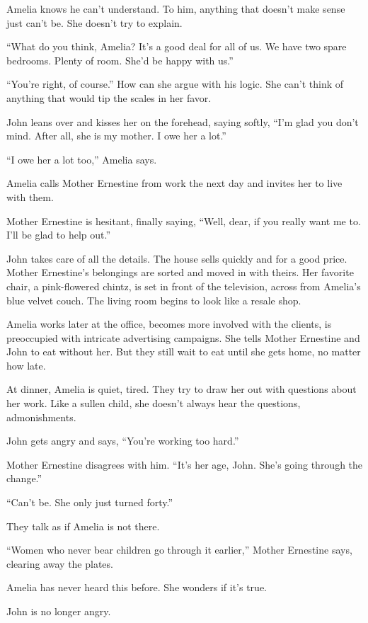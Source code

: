 \documentclass[
]{article}
\begin{document}
Amelia knows he can't understand. To him, anything that doesn't make
sense just can't be. She doesn't try to explain.

``What do you think, Amelia? It's a good deal for all of us. We have two
spare bedrooms. Plenty of room. She'd be happy with us.''

``You're right, of course.'' How can she argue with his logic. She can't
think of anything that would tip the scales in her favor.

John leans over and kisses her on the forehead, saying softly, ``I'm
glad you don't mind. After all, she is my mother. I owe her a lot.''

``I owe her a lot too,'' Amelia says.

Amelia calls Mother Ernestine from work the next day and invites her to
live with them.

Mother Ernestine is hesitant, finally saying, ``Well, dear, if you
really want me to. I'll be glad to help out.''

John takes care of all the details. The house sells quickly and for a
good price. Mother Ernes­tine's belongings are sorted and moved in with
theirs. Her favorite chair, a pink-flowered chintz, is set in front of
the television, across from Amelia's blue velvet couch. The living room
begins to look like a resale shop.

Amelia works later at the office, becomes more involved with the
clients, is preoccupied with intricate advertising campaigns. She tells
Mother Ernestine and John to eat without her. But they still wait to eat
until she gets home, no matter how late.

At dinner, Amelia is quiet, tired. They try to draw her out with
questions about her work. Like a sullen child, she doesn't always hear
the questions, admonishments.

John gets angry and says, ``You're working too hard.''

Mother Ernestine disagrees with him. ``It's her age, John. She's going
through the change.''

``Can't be. She only just turned forty.''

They talk as if Amelia is not there.

``Women who never bear children go through it earlier,'' Mother
Ernestine says, clearing away the plates.

Amelia has never heard this before. She wonders if it's true.

John is no longer angry.
\end{document}
